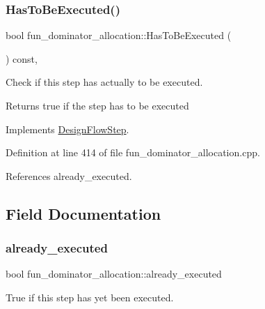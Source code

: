 \subsubsection{\texorpdfstring{Has\+To\+Be\+Executed()}{HasToBeExecuted()}}
{\footnotesize\ttfamily bool fun\+\_\+dominator\+\_\+allocation\+::\+Has\+To\+Be\+Executed (\begin{DoxyParamCaption}{ }\end{DoxyParamCaption}) const\hspace{0.3cm}{\ttfamily [override]}, {\ttfamily [virtual]}}



Check if this step has actually to be executed. 

\begin{DoxyReturn}{Returns}
true if the step has to be executed 
\end{DoxyReturn}


Implements \hyperlink{classDesignFlowStep_a1783abe0c1d162a52da1e413d5d1ef05}{Design\+Flow\+Step}.



Definition at line 414 of file fun\+\_\+dominator\+\_\+allocation.\+cpp.



References already\+\_\+executed.



\subsection{Field Documentation}
\mbox{\label{classfun__dominator__allocation_a4d4fbf7f9b5466a2ae199cce16ee1b19}} 
\subsubsection{\texorpdfstring{already\+\_\+executed}{already\_executed}}
{\footnotesize\ttfamily bool fun\+\_\+dominator\+\_\+allocation\+::already\+\_\+executed\hspace{0.3cm}{\ttfamily [protected]}}



True if this step has yet been executed. 



